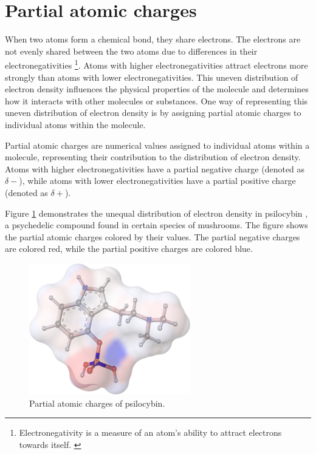 \documentclass[
  digital,     %
  oneside,     %
  nosansbold,  %
  nocolorbold, %
  lof,         %
  lot,         %
]{fithesis4}
\begin{document}
\section{Partial atomic charges}
\label{section:partial_atomic_charges}

When two atoms form a chemical bond, they share electrons. The electrons are not evenly shared between the two atoms due to differences in their electronegativities \footnote[1]{Electronegativity is a measure of an atom's ability to attract electrons towards itself. \cite{clark2018biology}}. Atoms with higher electronegativities attract electrons more strongly than atoms with lower electronegativities. This uneven distribution of electron density influences the physical properties of the molecule and determines how it interacts with other molecules or substances. One way of representing this uneven distribution of electron density is by assigning partial atomic charges to individual atoms within the molecule. \cite{schindler2019thesis}

Partial atomic charges are numerical values assigned to individual atoms within a molecule, representing their contribution to the distribution of electron density. Atoms with higher electronegativities have a partial negative charge (denoted as $\delta-$), while atoms with lower electronegativities have a partial positive charge (denoted as $\delta+$). \cite{racek2022thesis}

Figure \ref{fig:psilocybin} demonstrates the unequal distribution of electron density in psilocybin \cite{pubchem_psilocybine}, a psychedelic compound found in certain species of mushrooms. The figure shows the partial atomic charges colored by their values. The partial negative charges are colored red, while the partial positive charges are colored blue.

\begin{figure}[htbp]
  \begin{center}
    \includegraphics[width=7cm]{figures/psilocybine.png}
  \end{center}
  \caption{Partial atomic charges of psilocybin.}
  \label{fig:psilocybin}
\end{figure}
\end{document}
